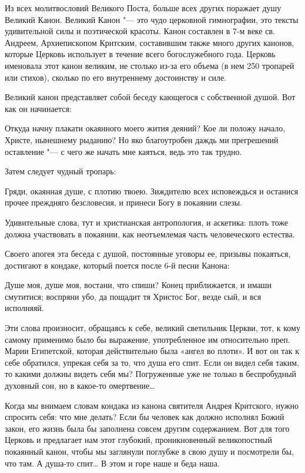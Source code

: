 Из всех молитвословий Великого Поста, больше всех других поражает душу Великий Канон. Великий Канон "--- это чудо церковной гимнографии, это тексты удивительной силы и поэтической красоты. Канон составлен в 7-м веке св. Андреем, Архиепископом Критским, составившим также много других канонов, которые Церковь использует в течение всего богослужебного года. Церковь именовала этот канон великим, не столько из-за его объема (в нем 250 тропарей или стихов), сколько по его внутреннему достоинству и силе.


Великий канон представляет собой беседу кающегося с собственной душой. Вот как он начинается:


Откуда начну плакати окаянного моего жития деяний? Кое ли положу начало, Христе, нынешнему рыданию? Но яко благоутробен даждь ми прегрешений оставление "--- с чего же начать мне каяться, ведь это так трудно.


Затем следует чудный тропарь:


Гряди, окаянная душе, с плотию твоею. Зиждителю всех исповеждься и останися прочее преждняго безсловесия, и принеси Богу в покаянии слезы.


Удивительные слова, тут и христианская антропология, и аскетика: плоть тоже должна участвовать в покаянии, как неотъемлемая часть человеческого естества.


Своего апогея эта беседа с душой, постоянные уговоры ее, призывы покаяться, достигают в кондаке, который поется после 6-й песни Канона:


Душе моя, душе моя, востани, что спиши? Конец приближается, и имаши смутитися; воспряни убо, да пощадит тя Христос Бог, везде сый, и вся исполняяй.


Эти слова произносит, обращаясь к себе, великий светильник Церкви, тот, к кому самому применимо было бы выражение, употребленное им относительно преп. Марии Египетской, которая действительно была «ангел во плоти». И вот он так к себе обратился, упрекая себя за то, что душа его спит. Если он видел себя таким, то какими должны видеть себя мы? Погруженные уже не только в беспробудный духовный сон, но в какое-то омертвение…


Когда мы внимаем словам кондака из канона святителя Андрея Критского, нужно спросить себя: что мне делать? Если бы человек как должно исполнял Божий закон, его жизнь была бы заполнена совсем другим содержанием. Вот для того Церковь и предлагает нам этот глубокий, проникновенный великопостный покаянный канон, чтобы мы заглянули поглубже в свою душу и посмотрели бы, что там. А душа-то спит… В этом и горе наше и беда наша.


